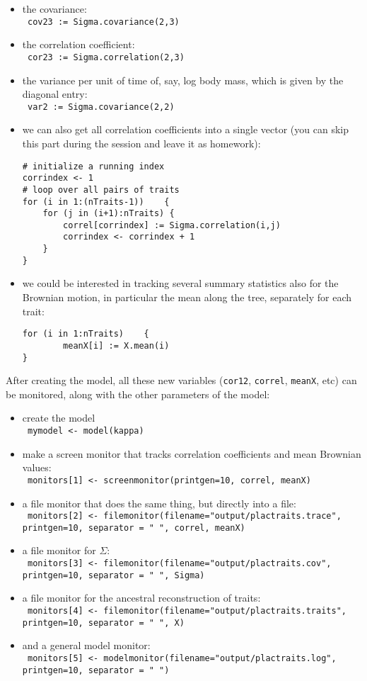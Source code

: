 \documentclass[usletter]{article}
\newcommand{\cmd}[1]{\texttt{#1}}
\begin{document}
\begin{itemize}
\item
the covariance:
\\
\cmd{
cov23 := Sigma.covariance(2,3)
}
\item
the correlation coefficient:
\\
\cmd{
cor23 := Sigma.correlation(2,3)
}
\item
the variance per unit of time of, say, log body mass, which is given by the diagonal entry:
\\
\cmd{
var2 := Sigma.covariance(2,2)
}
\item
we can also get all correlation coefficients into a single vector (you can skip this part during the session and leave it as  homework):
\begin{verbatim}
# initialize a running index
corrindex <- 1
# loop over all pairs of traits
for (i in 1:(nTraits-1))    {
    for (j in (i+1):nTraits) {
        correl[corrindex] := Sigma.correlation(i,j)
        corrindex <- corrindex + 1
    }
}
\end{verbatim}
\item
we could be interested in tracking several summary statistics also for the Brownian motion, in particular the mean along the tree, separately for each trait:
\begin{verbatim}
for (i in 1:nTraits)    {
        meanX[i] := X.mean(i)
}
\end{verbatim}
\end{itemize}
After creating the model, all these new variables (\cmd{cor12}, \cmd{correl}, \cmd{meanX}, etc) can be monitored, along with the other parameters of the model:
\begin{itemize}
\item
create the model
\\
\cmd{
mymodel <- model(kappa)
}
\item
make a screen monitor that tracks correlation coefficients and mean Brownian values:
\\
\cmd{
monitors[1] <- screenmonitor(printgen=10, correl, meanX)
}
\item
a file monitor that does the same thing, but directly into a file:
\\
\cmd{
monitors[2] <- filemonitor(filename="output/plactraits.trace", printgen=10, separator = "       ", correl, meanX)
}
\item
a file monitor for $\Sigma$:
\\
\cmd{
monitors[3] <- filemonitor(filename="output/plactraits.cov", printgen=10, separator = "  ", Sigma)
}
\item
a file monitor for the ancestral reconstruction of traits:
\\
\cmd{
monitors[4] <- filemonitor(filename="output/plactraits.traits", printgen=10, separator = "       ", X)
}
\item
and a general model monitor:
\\
\cmd{
monitors[5] <- modelmonitor(filename="output/plactraits.log", printgen=10, separator = " ")
}
\end{itemize}
\end{document}
